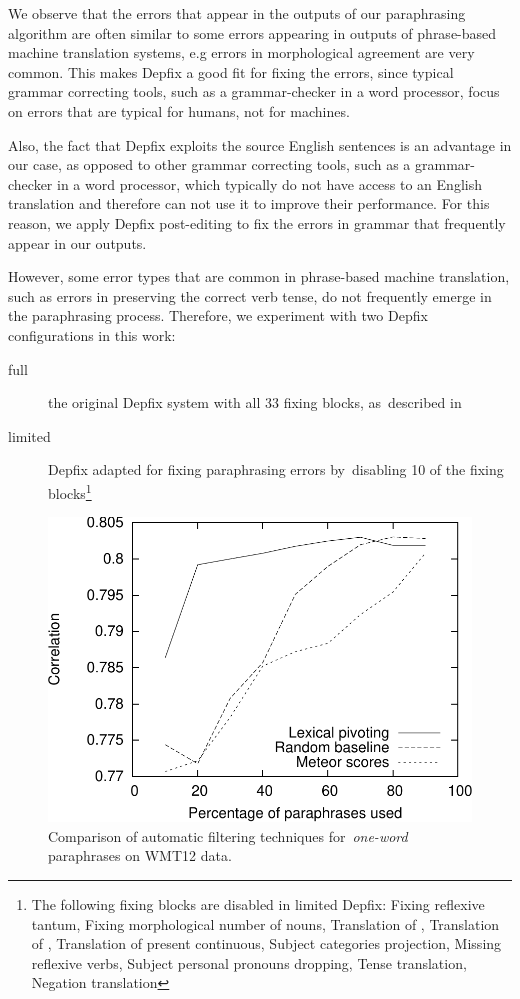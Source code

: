 We observe that the errors that appear in the outputs of our paraphrasing
algorithm are often similar to some errors appearing in outputs of phrase-based
machine translation systems, e.g errors in morphological agreement are very common.
This makes Depfix a good fit for fixing the errors, since typical
grammar correcting tools, such as a grammar-checker in a word processor,
focus on errors that are typical for humans, not for machines.

Also, the fact that Depfix exploits the source English sentences is an advantage 
in our case, as opposed to other grammar correcting tools, such as a 
grammar-checker in a word processor, which typically do not have access to an 
English translation and therefore can not use it to improve their performance.
For this reason, we apply Depfix post-editing to fix the errors in grammar that 
frequently appear in our outputs.

However, some error types that are common in phrase-based machine translation, 
such as errors in preserving the correct verb tense, do not frequently emerge in the 
paraphrasing process.
Therefore, we experiment with two Depfix configurations in this work:
\begin{description}
\item[full] the original Depfix system with all 33 fixing blocks,
as~described in \cite{rosa:mgr}
\item[limited] Depfix adapted for fixing paraphrasing errors by~disabling 10 of
the fixing blocks\footnote{%
The following fixing blocks are disabled in limited Depfix:
Fixing reflexive tantum,
Fixing morphological number of nouns,
Translation of , 
Translation of , 
Translation of present continuous,
Subject categories projection,
Missing reflexive verbs,
Subject personal pronouns dropping,
Tense translation,
Negation translation}
\end{description}

\begin{figure}[ht]
\begin{center}
\includegraphics[scale=0.55]{../img/filtering-lexical-cropped.pdf}
\caption{Comparison of automatic filtering techniques for~\emph{one-word} paraphrases on WMT12 data.}
\label{fig:filtering-lexical}
\end{center}
\end{figure}

